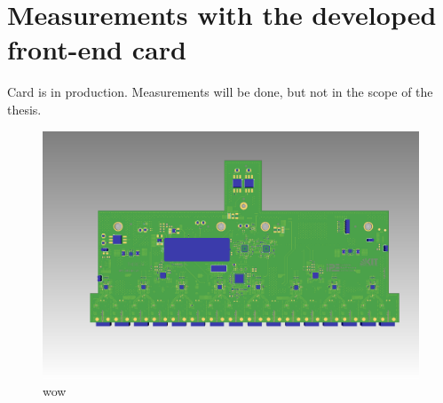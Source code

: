 \section{Measurements with the developed front-end card}
Card is in production. Measurements will be done, but not in the scope of the thesis.
\begin{figure}[H]
	\centering
	\includegraphics[width = \textwidth]{chap/06-conclusion/img/board_ugly}
	\caption{wow}
	\label{fig:board}
\end{figure}

